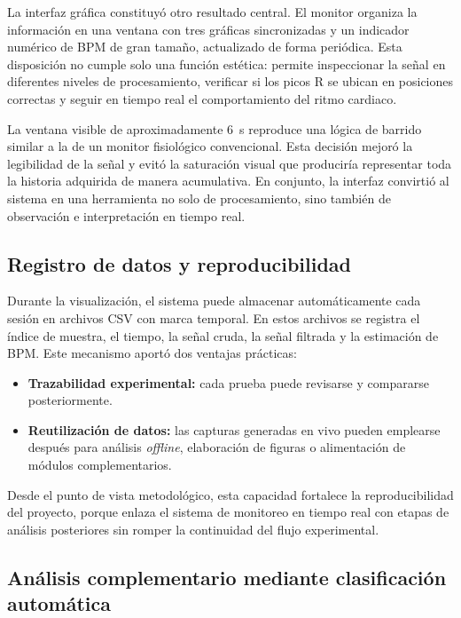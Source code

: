 La interfaz gráfica constituyó otro resultado central. El monitor organiza la
información en una ventana con tres gráficas sincronizadas y un indicador numérico
de BPM de gran tamaño, actualizado de forma periódica. Esta disposición no cumple
solo una función estética: permite inspeccionar la señal en diferentes niveles de
procesamiento, verificar si los picos R se ubican en posiciones correctas y seguir
en tiempo real el comportamiento del ritmo cardiaco.

La ventana visible de aproximadamente 6~s reproduce una lógica de barrido similar
a la de un monitor fisiológico convencional. Esta decisión mejoró la legibilidad
de la señal y evitó la saturación visual que produciría representar toda la
historia adquirida de manera acumulativa. En conjunto, la interfaz convirtió al
sistema en una herramienta no solo de procesamiento, sino también de observación
e interpretación en tiempo real.

\subsection{Registro de datos y reproducibilidad}

Durante la visualización, el sistema puede almacenar automáticamente cada sesión
en archivos CSV con marca temporal. En estos archivos se registra el índice de
muestra, el tiempo, la señal cruda, la señal filtrada y la estimación de BPM.
Este mecanismo aportó dos ventajas prácticas:

\begin{itemize}
    \item \textbf{Trazabilidad experimental:} cada prueba puede revisarse y
        compararse posteriormente.
    \item \textbf{Reutilización de datos:} las capturas generadas en vivo pueden
        emplearse después para análisis \textit{offline}, elaboración de figuras
        o alimentación de módulos complementarios.
\end{itemize}

Desde el punto de vista metodológico, esta capacidad fortalece la reproducibilidad
del proyecto, porque enlaza el sistema de monitoreo en tiempo real con etapas de
análisis posteriores sin romper la continuidad del flujo experimental.

\subsection{Análisis complementario mediante clasificación automática}

